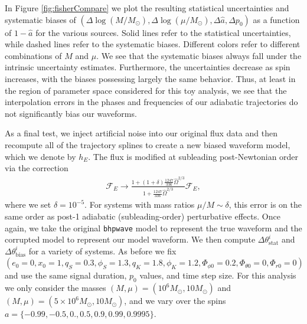 \documentclass[%
 reprint,
 nofootinbib,
 amsmath,amssymb,
 aps,
 prd,
]{revtex4-2}
\begin{document}
In Figure \ref{fig:fisherCompare} we plot the resulting statistical uncertainties and systematic biases of $(\Delta\log(M/M_\odot), \Delta\log(\mu/M_\odot), \Delta \hat{a}, \Delta p_0)$ as a function of $1-\hat{a}$ for the various sources. Solid lines refer to the statistical uncertainties, while dashed lines refer to the systematic biases. Different colors refer to different combinations of $M$ and $\mu$. We see that the systematic biases always fall under the intrinsic uncertainty estimates. Furthermore, the uncertainties decrease as spin increases, with the biases possessing largely the same behavior. Thus, at least in the region of parameter space considered for this toy analysis, we see that the interpolation errors in the phases and frequencies of our adiabatic trajectories do not significantly bias our waveforms.

As a final test, we inject artificial noise into our original flux data and then recompute all of the trajectory splines to create a new biased waveform model, which we denote by $h_E$. The flux is modified at subleading post-Newtonian order via the correction
\begin{align}
    \mathcal{F}_E \rightarrow \frac{1 + (1 + \delta)\frac{1247}{336}\hat{\Omega}^{2/3}}{1 + \frac{1247}{336}\hat{\Omega}^{2/3}} \mathcal{F}_E,
\end{align}
where we set $\delta = 10^{-5}$. For systems with mass ratios $\mu/M \sim \delta$, this error is on the same order as post-1 adiabatic (subleading-order) perturbative effects. Once again, we take the original \texttt{bhpwave} model to represent the true waveform and the corrupted model to represent our model waveform. We then compute $\Delta \theta^i_\mathrm{stat}$ and $\Delta \theta^i_\mathrm{bias}$ for a variety of systems. As before we fix $(e_0 = 0, x_0 = 1, q_S = 0.3, \phi_S = 1.3, q_K = 1.8, \phi_K = 1.2, \Phi_{\phi 0} = 0.2, \Phi_{\theta0} = 0, \Phi_{r0} = 0)$ and use the same signal duration, $p_0$ values, and time step size. For this analysis we only consider the masses $(M, \mu) = (10^6 M_\odot, 10 M_\odot)$ and $(M, \mu) = (5\times 10^6 M_\odot, 10 M_\odot)$, and we vary over the spins $a = \{-0.99, -0.5, 0., 0.5, 0.9, 0.99, 0.9995\}$.
\end{document}
